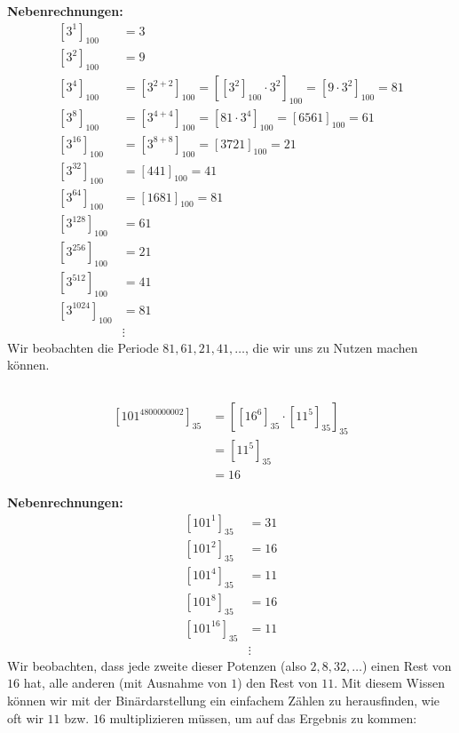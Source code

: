 \documentclass{../crypto}
\begin{document}
\textbf{Nebenrechnungen:}
\begin{align*}
  \left[3^{1}\right]_{100} &= 3 \\
  \left[3^{2}\right]_{100} &= 9 \\
  \left[3^{4}\right]_{100} &= \left[3^{2+2}\right]_{100} 
                            = \left[\left[3^{2}\right]_{100} \cdot 3^{2}\right]_{100} 
                            = \left[9 \cdot 3^{2}\right]_{100} = 81 \\
  \left[3^{8}\right]_{100} &= \left[3^{4+4}\right]_{100}
                            = \left[81 \cdot 3^{4}\right]_{100} 
                            = \left[6561\right]_{100} = 61 \\
  \left[3^{16}\right]_{100} &= \left[3^{8+8}\right]_{100}
                             = \left[3721\right]_{100} = 21 \\
  \left[3^{32}\right]_{100} &= \left[441\right]_{100} = 41 \\
  \left[3^{64}\right]_{100} &= \left[1681\right]_{100} = 81 \\
  \left[3^{128}\right]_{100} &= 61 \\
  \left[3^{256}\right]_{100} &= 21 \\
  \left[3^{512}\right]_{100} &= 41 \\
  \left[3^{1024}\right]_{100} &= 81 \\
                              &\vdots
\end{align*}
Wir beobachten die Periode $81, 61, 21, 41, \dots$, die wir uns zu Nutzen machen können.

\subsection{}
\begin{align*}
  \left[101^{4800000002}\right]_{35} &= \left[ \left[16^6\right]_{35} 
                                         \cdot \left[11^5\right]_{35}
                                        \right]_{35} \\
                                     &= \left[11^5\right]_{35} \\
                                     &= 16
\end{align*}

\textbf{Nebenrechnungen:}
\begin{align*}
  \left[101^{1}\right]_{35} &= 31 \\
  \left[101^{2}\right]_{35} &= 16 \\
  \left[101^{4}\right]_{35} &= 11 \\
  \left[101^{8}\right]_{35} &= 16 \\
  \left[101^{16}\right]_{35} &= 11 \\
                             &\vdots
\end{align*}
Wir beobachten, dass jede zweite dieser Potenzen (also $2, 8, 32, \dots$) einen
Rest von $16$ hat, alle anderen (mit Ausnahme von $1$) den Rest von $11$.
Mit diesem Wissen können wir mit der Binärdarstellung ein einfachem Zählen zu 
herausfinden, wie oft wir $11$ bzw. $16$ multiplizieren müssen, um auf das 
Ergebnis zu kommen:
\end{document}
